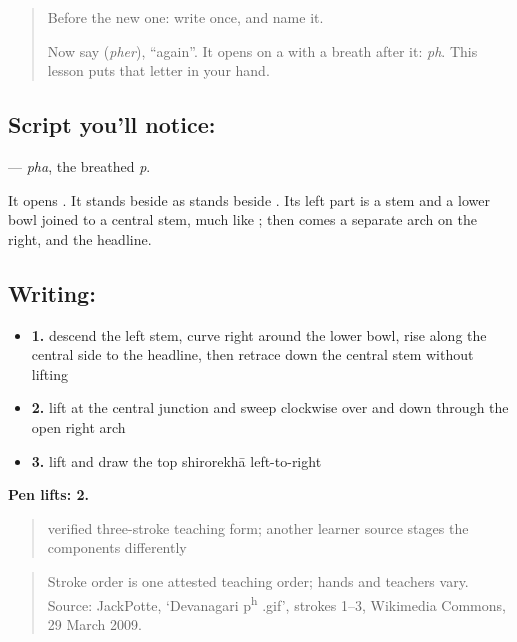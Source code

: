 \label{lesson:MW-W50-pha}



\begin{quote}
Before the new one: write \textbf{} once, and name it.

Now say \textbf{} (\emph{pher}), \textquotedblleft{}again\textquotedblright{}. It opens on a \textbf{} with a breath after it: \emph{ph}. This lesson puts that letter in your hand.
\end{quote}

\subsection*{Script you'll notice: }
\textbf{} — \emph{pha}, the breathed \emph{p}.

It opens \textbf{}. It stands beside \textbf{} as \textbf{} stands beside \textbf{}. Its left part is a stem and a lower bowl joined to a central stem, much like \textbf{}; then comes a separate arch on the right, and the headline.

\subsection*{Writing: }

\begin{itemize}
\raggedright
  \item \textbf{1.} descend the left stem, curve right around the lower bowl, rise along the central side to the headline, then retrace down the central stem without lifting
  \item \textbf{2.} lift at the central junction and sweep clockwise over and down through the open right arch
  \item \textbf{3.} lift and draw the top shirorekhā left-to-right
\end{itemize}

\textbf{Pen lifts: 2.}

\begin{quote}
verified three-stroke teaching form; another learner source stages the components differently
\end{quote}

\begin{quote}
Stroke order is one attested teaching order; hands and teachers vary. Source: JackPotte, ‘Devanagari p\textsuperscript{h} .gif’, strokes 1–3, Wikimedia Commons, 29 March 2009.
\end{quote}

